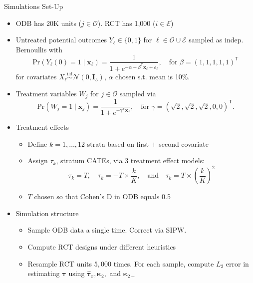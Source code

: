 \documentclass[usenames,dvipsnames]{beamer}
\newcommand{\bstau}{\boldsymbol{\tau}}
\newcommand{\taur}{\boldsymbol{\hat \tau_r}}
\newcommand{\bskap}{\boldsymbol{ \kappa}}
\newcommand{\bsx}{\boldsymbol{x}}
\newcommand{\err}{\varepsilon}
\newcommand{\tran}{\mathsf{T}}
\newcommand{\simiid}{\stackrel{\mathrm{iid}}\sim}
\theoremstyle{definition} %
\begin{document}
\begin{frame}[allowframebreaks]{Simulations Set-Up}
\begin{itemize}
\item ODB has 20K units ($j \in \mathcal{O}$). RCT has 1,000 ($i \in \mathcal{E}$)
\item Untreated potential outcomes $Y_{\ell} \in \{0, 1\}$ for $\ell \in \mathcal{O} \cup \mathcal{E}$ sampled as indep. Bernoullis with
\[\text{Pr}(Y_\ell(0) = 1 \mid \bsx_\ell) = \frac{1}{1 + e^{-\alpha -\beta^\tran\bsx_\ell + \err_\ell}} ,\quad\text{for $\beta = (1,1,1,1,1)^\tran$}\]  
for covariates $X_{\ell} \simiid \mathcal{N}(0, \boldsymbol I_5)$, $\alpha$ chosen s.t. mean is 10\%. 
\item Treatment variables $W_j$ for $j \in \mathcal{O}$ sampled via
\[\text{Pr}(W_j = 1 \mid \bsx_j) = \frac{1}{1 + e^{-\gamma^\tran\bsx_j}},\quad\text{for $\gamma = (\sqrt{2}, \sqrt{2}, \sqrt{2}, 0, 0)^\tran$.}\] 
\pagebreak
\item Treatment effects 
\begin{itemize}
\item Define $k = 1, \dots, 12$ strata based on first $+$ second covariate 
\item Assign $\tau_k$,  stratum CATEs, via 3 treatment effect models:
\[ \tau_k  = T, \quad \tau_k = -T\times \frac{k}{K},\quad\text{and}\quad
\tau_k  = T\times \left(\frac{k}{K}\right)^2 \] 
\item  $T$ chosen so that Cohen's D in ODB equals 0.5 
\end{itemize}
\item Simulation structure
\begin{itemize}
\item Sample ODB data a single time. Correct via SIPW.  
\item Compute RCT designs under different heuristics 
\item Resample RCT units $5,000$ times. For each sample, compute $L_2$ error in estimating $\bstau$ using $\taur, \bskap_2,$ and $\bskap_{2+}$
\end{itemize}
\end{itemize}
\end{frame}
\end{document}
